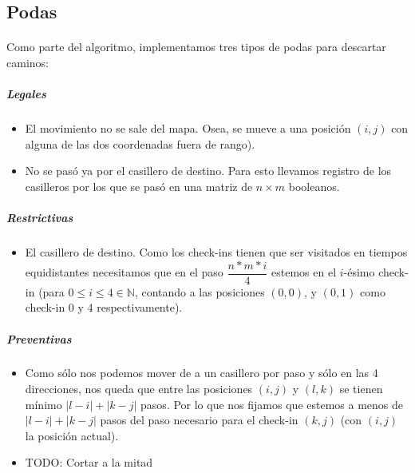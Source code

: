 \documentclass[./main.tex]{subfiles}
\begin{document}
\subsection{Podas}
\label{sec:ej1-podas}

\paragraph{} Como parte del algoritmo, implementamos tres tipos de podas para descartar caminos:
\subparagraph{Legales}
\begin{itemize}
  \item El movimiento no se sale del mapa. Osea, se mueve a una posición \((i, j)\) con alguna de las dos coordenadas fuera de rango).
  \item No se pasó ya por el casillero de destino. Para esto llevamos registro de los casilleros por los que se pasó en una matriz de \(n \times m\) booleanos.
\end{itemize}

\subparagraph{Restrictivas}
\begin{itemize}
  \item El casillero de destino. Como los check-ins tienen que ser visitados en tiempos equidistantes necesitamos que en el paso \(\dfrac{n*m*i}{4}\) estemos en el \(i\)-ésimo check-in (para \(0\leq i \leq 4 \in \mathbb{N}\), contando a las posiciones \((0, 0)\), y \((0, 1)\) como check-in 0 y 4 respectivamente).
\end{itemize}

\subparagraph{Preventivas}
\begin{itemize}
  \item Como sólo nos podemos mover de a un casillero por paso y sólo en las 4 direcciones, nos queda que entre las posiciones \((i, j)\) y \((l, k)\) se tienen mínimo \(|l-i| + |k-j|\) pasos. Por lo que nos fijamos que estemos a menos de \(|l-i| + |k-j|\) pasos del paso necesario para el check-in \((k, j)\) (con \((i, j)\) la posición actual). %
  \item TODO: Cortar a la mitad
\end{itemize}

\end{document}

